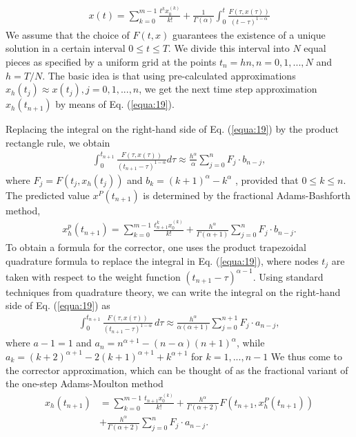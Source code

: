\documentclass[10pt]{article}
\begin{document}
\begin{multicols}{2}
\begin{align}
    x(t) = \sum_{k=0}^{m-1} \frac{t^k x_0^{(k)}}{k!} + \frac{1}{\Gamma (\alpha)} \int_0^t \frac{F(\tau , x(\tau))}{(t- \tau)^{1-\alpha}} \label{equa:19}
\end{align}
We assume that the choice of $F(t, x)$ guarantees the existence of a unique solution in a certain interval $0 \le t \le T$. We divide this interval into $N$ equal pieces as specified by a uniform grid at the points $t_n = hn, n = 0, 1, . . . , N$ and $h = T / N$. The basic idea is that using pre-calculated approximations $x_h(t_j ) \approx x(t_j ), j = 0, 1, . . . , n$, we get the next time step approximation $x_h(t_{n+1})$ by means of Eq. (\ref{equa:19}). \par
Replacing the integral on the right-hand side of Eq. (\ref{equa:19}) by the product rectangle rule, we obtain
\begin{align}
    \int_0^{t_{n+1}} \frac{F(\tau , x(\tau))}{(t_{n+1}-\tau)^{1-\alpha}}d\tau \approx \frac{h^\alpha}{\alpha} \sum_{j=0}^n F_j \cdot b_{n-j}, \label{equa:20}
\end{align}
where $F_j = F(t_j , x_h(t_j))$ and $b_k = (k + 1)^\alpha - k^\alpha$ , provided that $0 \le k \le n$. The predicted value $x^P (t_{n+1})$ is determined by the fractional Adams-Bashforth method,
\begin{align}
   x_h^p (t_{n+1}) = \sum_{k=0}^{m-1} \frac{t_{n+1}^k x_0^{(k)}}{k!} + \frac{h^\alpha}{\Gamma (\alpha + 1)} \sum_{j=0}^n F_j \cdot b_{n-j}. \label{equa:21}
\end{align}
To obtain a formula for the corrector, one uses the product trapezoidal quadrature formula to replace the integral in Eq. (\ref{equa:19}), where nodes $t_j$ are taken with respect to the weight function $(t_{n+1} - \tau)^{\alpha - 1}$. Using standard techniques from quadrature theory, we can write the integral on the right-hand side of Eq. (\ref{equa:19}) as
\begin{align}
   \int_0^{t_{n+1}} \frac{F(\tau,x(\tau))}{(t_{n+1}-\tau)^{1-\alpha}}\,d\tau \approx \frac{h^\alpha}{\alpha(\alpha + 1)} \sum_{j=0}^{n+1} F_j \cdot a_{n-j}, \label{equa:22}
\end{align}
where $a-1 = 1$ and $a_n = n^{\alpha + 1}-(n-\alpha)(n+1)^\alpha$, while $a_k = (k+2)^{\alpha + 1} - 2(k+1)^{\alpha + 1} + k^{\alpha + 1}$ for $k = 1, ..., n-1$ We thus come to the corrector approximation, which can be thought of as the fractional variant of the one-step Adams-Moulton method
\begin{align}
   x_h(t_{n+1}) & = \sum_{k=0}^{m-1} \frac{t_{n+1}x_0^{(k)}}{k!} + \frac{h^\alpha}{\Gamma (\alpha + 2)}  F(t_{n+1}, x_h^P (t_{n+1})) \nonumber \\ &+ \frac{h^\alpha}{\Gamma (\alpha + 2)} \sum_{j=0}^n F_j \cdot a_{n-j}. \label{equa:23}

\end{align}
\end{multicols}
\end{document}
